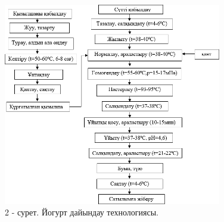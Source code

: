 \begin{figure}[H]
	\centering
	\includegraphics[width=0.85\textwidth]{media/pish/image3}
	\caption*{2 - сурет. Йогурт дайындау технологиясы.}
\end{figure}

